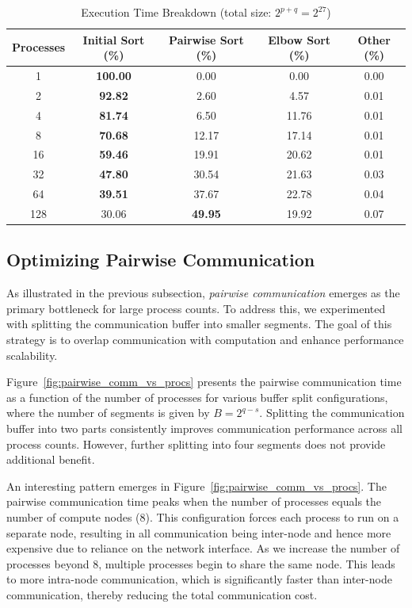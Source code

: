 \documentclass{article}
\begin{document}
\begin{table}[h]
\centering
\begin{tabular}{|c|c|c|c|c|}
\hline
\textbf{Processes} & \textbf{Initial Sort (\%)} & \textbf{Pairwise Sort (\%)} & 
\textbf{Elbow Sort (\%)} & \textbf{Other (\%)} \\
\hline
1 & \textbf{100.00} & 0.00 & 0.00 & 0.00 \\
2 & \textbf{92.82} & 2.60 & 4.57 & 0.01 \\
4 & \textbf{81.74} & 6.50 & 11.76 & 0.01 \\
8 & \textbf{70.68} & 12.17 & 17.14 & 0.01 \\
16 & \textbf{59.46} & 19.91 & 20.62 & 0.01 \\
32 & \textbf{47.80} & 30.54 & 21.63 & 0.03 \\
64 & \textbf{39.51} & 37.67 & 22.78 & 0.04 \\
128 & 30.06 & \textbf{49.95} & 19.92 & 0.07 \\
\hline
\end{tabular}
\caption{Execution Time Breakdown (total size: $2^{p+q} = 2^{27}$)}
\label{tab:time_breakdown}
\end{table}

\subsection{Optimizing Pairwise Communication}

As illustrated in the previous subsection, \textit{pairwise communication} emerges as the primary bottleneck 
for large process counts. To address this, we experimented with splitting the communication buffer into smaller
segments. The goal of this strategy is to overlap communication with computation and enhance performance 
scalability.

Figure~\ref{fig:pairwise_comm_vs_procs} presents the pairwise communication time as a function of the number of
processes for various buffer split configurations, where the number of segments is given by $B = 2^{q-s}$. 
Splitting the communication buffer into two parts consistently improves communication performance across all 
process counts. However, further splitting into four segments does not provide additional benefit.

An interesting pattern emerges in Figure~\ref{fig:pairwise_comm_vs_procs}. The pairwise communication time 
peaks when the number of processes equals the number of compute nodes (8). This configuration forces each 
process to run on a separate node, resulting in all communication being inter-node and hence more expensive 
due to reliance on the network interface. As we increase the number of processes beyond 8, multiple processes 
begin to share the same node. This leads to more intra-node communication, which is significantly faster than 
inter-node communication, thereby reducing the total communication cost.
\end{document}

